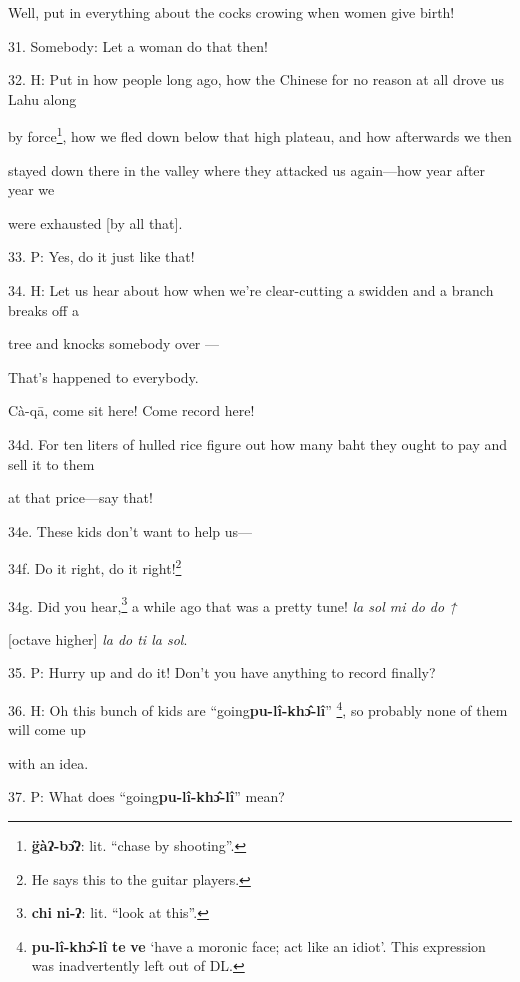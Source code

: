Well, put in everything about the cocks crowing when women give birth!

31. Somebody: Let a woman do that then!

32. H: Put in how people long ago, how the Chinese for no reason at all drove us
Lahu along

by force\footnote{\textbf{g̈àʔ-bɔ̂ʔ}: lit. ``chase by shooting''.}, how we fled down below that high plateau, and how afterwards we
then

stayed down there in the valley where they attacked us again---how year after year
we

were exhausted [by all that].

33. P: Yes, do it just like that!

34. H: Let us hear about how when we're clear-cutting a swidden and a branch breaks
off a

tree and knocks somebody over ---

That's happened to everybody.

Cà-qā, come sit here! Come record here!

34d. For ten liters of hulled rice figure out how many baht they ought to pay and
sell it to them

at that price---say that!

34e. These kids don't want to help us---


34f. Do it right, do it right!\footnote{He says this to the guitar players.}

34g. Did you hear,\footnote{\textbf{chi} \textbf{ni-ʔ}: lit. ``look at this''.} a while ago that was a pretty tune! \textit{la
sol mi do do ↑}

[octave higher] \textit{la do ti la sol}.

35. P: Hurry up and do it! Don't you have anything to record finally?

36. H: Oh this bunch of kids are ``going\textbf{pu-lî-khɔ̂-lî}''
\footnote{\textbf{pu-lî-khɔ̂-lî} \textbf{te} \textbf{ve} `have a moronic face; act like an idiot'. This expression was inadvertently left out of DL.}, so probably none of them will come up

with an idea.


37. P: What does ``going\textbf{pu-lî-khɔ̂-lî}'' mean?


